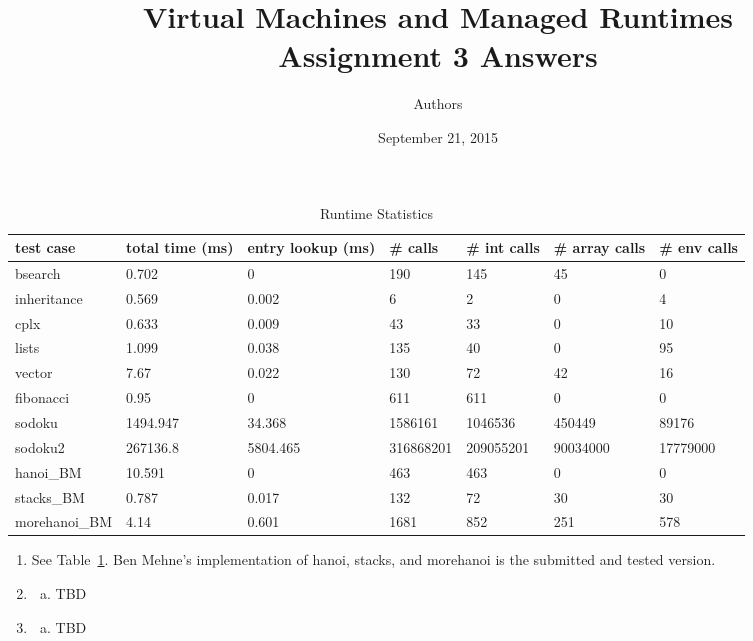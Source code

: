 \documentclass[notitlepage]{report}
\title{\vspace{-0.5in}Virtual Machines and Managed Runtimes \\ Assignment 3 Answers}
\date{\vspace{-0.5in}September 21, 2015}
\author{\vspace{-0.5in}Authors\vspace{-0.5in}}
\begin{document}
\maketitle

\begin{table}[!htp]
\centering
\caption{Runtime Statistics}
\label{statistics}
{\footnotesize
\begin{tabular}{lllllll}
\toprule
test case & total time (ms)    & entry lookup (ms) & \# calls & \# int calls & \# array calls & \# env calls \\
\midrule
bsearch       & 0.702      & 0                     & 190          & 145              & 45                 & 0                \\
inheritance   & 0.569      & 0.002                 & 6            & 2                & 0                  & 4                \\
cplx          & 0.633      & 0.009                 & 43           & 33               & 0                  & 10               \\
lists         & 1.099      & 0.038                 & 135          & 40               & 0                  & 95               \\
vector        & 7.67       & 0.022                 & 130          & 72               & 42                 & 16               \\
fibonacci     & 0.95       & 0                     & 611          & 611              & 0                  & 0                \\
sodoku        & 1494.947   & 34.368                & 1586161      & 1046536          & 450449             & 89176            \\
sodoku2       & 267136.8   & 5804.465              & 316868201    & 209055201        & 90034000           & 17779000         \\
hanoi\_BM     & 10.591     & 0                     & 463          & 463              & 0                  & 0                \\
stacks\_BM    & 0.787      & 0.017                 & 132          & 72               & 30                 & 30               \\
morehanoi\_BM & 4.14       & 0.601                 & 1681         & 852              & 251                & 578              \\
\bottomrule
\end{tabular}
}
\end{table}

\begin{enumerate}
	\item
			See Table~\ref{statistics}.  Ben Mehne's implementation of hanoi, stacks, and morehanoi is the submitted and tested version.
	\item
		\begin{enumerate}[(a)]
			\item TBD
		\end{enumerate}
	\item
		\begin{enumerate}[(a)]
			\item TBD
		\end{enumerate}
\end{enumerate}
\end{document}
